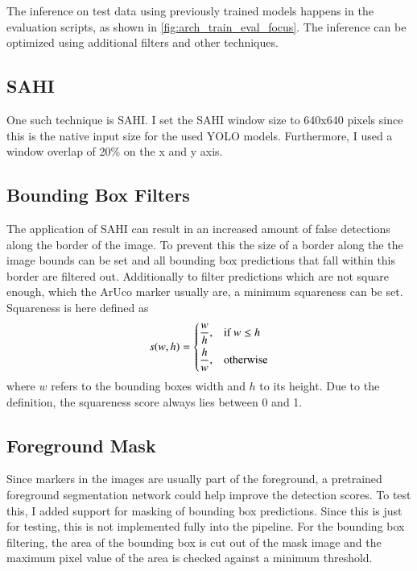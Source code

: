 \documentclass[10pt]{book}
\newcommand{\figureref}[1]{\autoref{#1}}
\begin{document}
The inference on test data using previously trained models happens in the evaluation scripts, as shown in \figureref{fig:arch_train_eval_focus}. The inference can be optimized using additional filters and other techniques. 

\subsection{SAHI}

One such technique is \ac{SAHI}. 
I set the \ac{SAHI} window size to 640x640 pixels since this is the native input size for the used \ac{YOLO} models. Furthermore, I used a window overlap of 20\% on the x and y axis.

\subsection{Bounding Box Filters}

The application of \ac{SAHI} can result in an increased amount of false detections along the border of the image. To prevent this the size of a border along the the image bounds can be set and all bounding box predictions that fall within this border are filtered out. Additionally to filter predictions which are not square enough, which the \ac{ArUco} marker usually are, a minimum squareness can be set. Squareness is here defined as $$ 
s(w,h)=
\begin{dcases}
    \frac{w}{h}, & \text{if } w\leq h\\
    \frac{h}{w}, & \text{otherwise}
\end{dcases} $$ where $w$ refers to the bounding boxes width and $h$ to its height. Due to the definition, the squareness score always lies between 0 and 1.

\subsection{Foreground Mask}

Since markers in the images are usually part of the foreground, a pretrained foreground segmentation network could help improve the detection scores.
To test this, I added support for masking of bounding box predictions. Since this is just for testing, this is not implemented fully into the pipeline. For the bounding box filtering, the area of the bounding box is cut out of the mask image and the maximum pixel value of the area is checked against a minimum threshold. %
\end{document}

